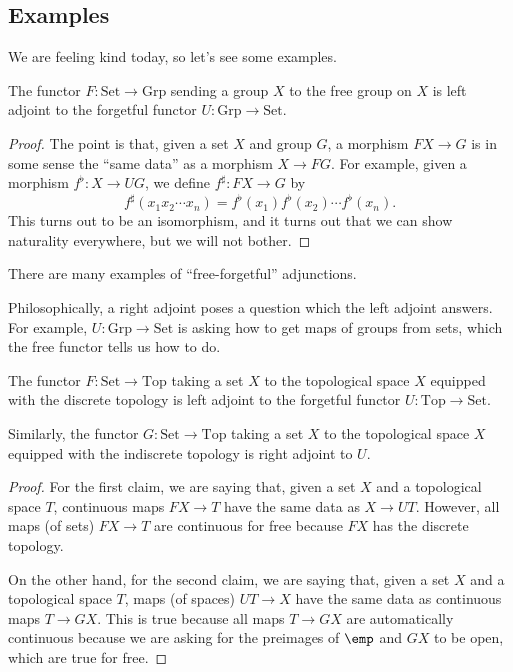 \documentclass[../notes.tex]{subfiles}
\begin{document}
\subsection{Examples}
We are feeling kind today, so let's see some examples.
\begin{exe}
	The functor $F:\mathrm{Set}\to\mathrm{Grp}$ sending a group $X$ to the free group on $X$ is left adjoint to the forgetful functor $U:\mathrm{Grp}\to\mathrm{Set}$.
\end{exe}
\begin{proof}
	The point is that, given a set $X$ and group $G$, a morphism $FX\to G$ is in some sense the ``same data'' as a morphism $X\to FG$. For example, given a morphism $f^\flat:X\to UG$, we define $f^\sharp:FX\to G$ by
	\[f^\sharp(x_1x_2\cdots x_n)=f^\flat(x_1)f^\flat(x_2)\cdots f^\flat(x_n).\]
	This turns out to be an isomorphism, and it turns out that we can show naturality everywhere, but we will not bother.
\end{proof}
\begin{remark}
	There are many examples of ``free-forgetful'' adjunctions.
\end{remark}
\begin{remark}
	Philosophically, a right adjoint poses a question which the left adjoint answers. For example, $U:\mathrm{Grp}\to\mathrm{Set}$ is asking how to get maps of groups from sets, which the free functor tells us how to do.
\end{remark}
\begin{exe}
	The functor $F:\mathrm{Set}\to\mathrm{Top}$ taking a set $X$ to the topological space $X$ equipped with the discrete topology is left adjoint to the forgetful functor $U:\mathrm{Top}\to\mathrm{Set}$.

	Similarly, the functor $G:\mathrm{Set}\to\mathrm{Top}$ taking a set $X$ to the topological space $X$ equipped with the indiscrete topology is right adjoint to $U$.
\end{exe}
\begin{proof}
	For the first claim, we are saying that, given a set $X$ and a topological space $T$, continuous maps $FX\to T$ have the same data as $X\to UT$. However, all maps (of sets) $FX\to T$ are continuous for free because $FX$ has the discrete topology.

	On the other hand, for the second claim, we are saying that, given a set $X$ and a topological space $T$, maps (of spaces) $UT\to X$ have the same data as continuous maps $T\to GX$. This is true because all maps $T\to GX$ are automatically continuous because we are asking for the preimages of $\emp$ and $GX$ to be open, which are true for free.
\end{proof}
\end{document}
